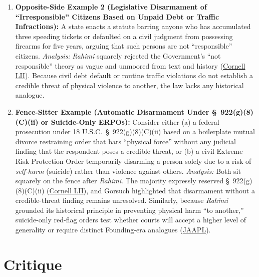 \documentclass[12pt]{article}
\begin{document}
\begin{enumerate}
\item \textbf{Opposite-Side Example 2 (Legislative Disarmament of ``Irresponsible'' Citizens Based on Unpaid Debt or Traffic Infractions):} A state enacts a statute barring anyone who has accumulated three speeding tickets or defaulted on a civil judgment from possessing firearms for five years, arguing that such persons are not ``responsible'' citizens. \textit{Analysis:} \textit{Rahimi} squarely rejected the Government's ``not responsible'' theory as vague and unmoored from text and history (\href{https://www.law.cornell.edu/supremecourt/text/22-915}{Cornell LII}). Because civil debt default or routine traffic violations do not establish a credible threat of physical violence to another, the law lacks any historical analogue.

\item \textbf{Fence-Sitter Example (Automatic Disarmament Under \S\ 922(g)(8)(C)(ii) or Suicide-Only ERPOs):} Consider either (a) a federal prosecution under 18 U.S.C.\ \S\ 922(g)(8)(C)(ii) based on a boilerplate mutual divorce restraining order that bars ``physical force'' without any judicial finding that the respondent poses a credible threat, or (b) a civil Extreme Risk Protection Order temporarily disarming a person solely due to a risk of \textit{self-harm} (suicide) rather than violence against others. \textit{Analysis:} Both sit squarely on the fence after \textit{Rahimi}. The majority expressly reserved \S\ 922(g)(8)(C)(ii) (\href{https://www.law.cornell.edu/supremecourt/text/22-915}{Cornell LII}), and Gorsuch highlighted that disarmament without a credible-threat finding remains unresolved. Similarly, because \textit{Rahimi} grounded its historical principle in preventing physical harm ``to another,'' suicide-only red-flag orders test whether courts will accept a higher level of generality or require distinct Founding-era analogues (\href{https://jaapl.org/custom-print/68663}{JAAPL}).
\end{enumerate}

\section{Critique}
\end{document}
